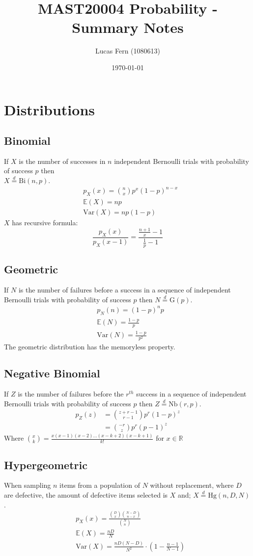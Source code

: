 \documentclass[titlepage,twocolumn]{article}
\title{MAST20004 Probability - Summary Notes}
\date{\today}
\author{Lucas Fern (1080613)}
\begin{document}
\section*{Distributions}
\subsection*{Binomial}
If $X$ is the number of successes in $n$ independent Bernoulli trials with probability of success $p$ then\\$X\stackrel{d}{=}\mbox{Bi}(n,p)$.
\begin{align*}
    &p_X(x)={\binom{n}{x}}p^x(1-p)^{n-x}\\
    &\mathbb{E}(X)=np\\
    &\mbox{Var}(X)=np(1-p)
\end{align*}
$X$ has recursive formula: $$\frac{p_X(x)}{p_X(x-1)}=\frac{\frac{n+1}{x}-1}{\frac{1}{p}-1}$$

\subsection*{Geometric}
If $N$ is the number of failures before a success in a sequence of independent Bernoulli trials with probability of success $p$ then $N\stackrel{d}{=}\mbox{G}(p)$.
\begin{align*}
    &p_N(n)=(1-p)^{n}p\\
    &\mathbb{E}(N)=\frac{1-p}{p}\\
    &\mbox{Var}(N)=\frac{1-p}{p^2}
\end{align*}
The geometric distribution has the memoryless property.

\subsection*{Negative Binomial}
If $Z$ is the number of failures before the $r^{th}$ success in a sequence of independent Bernoulli trials with probability of success $p$ then $Z\stackrel{d}{=}\mbox{Nb}(r,p)$.
\begin{align*}
    p_Z(z)&={\binom{z+r-1}{r-1}}p^r(1-p)^z\\
    &={\binom{-r}{z}}p^r(p-1)^z
\end{align*}
Where ${\binom{x}{k}} = \frac{x(x-1)(x-2)...(x-k+2)(x-k+1)}{k!}$ for $x \in \mathbb{R}$

\subsection*{Hypergeometric}
When sampling $n$ items from a population of $N$ without replacement, where $D$ are defective, the amount of defective items selected is $X$ and; $X\stackrel{d}{=}\mbox{Hg}(n,D,N)$.
\begin{align*}
    &p_X(x)=\frac{{\binom{D}{x}}{\binom{N-D}{n-x}}}{{\binom{N}{n}}}\\
    &\mathbb{E}(X)=\frac{nD}{N}\\
    &\mbox{Var}(X)=\frac{nD(N-D)}{N^2}\cdot(1-\frac{n-1}{N-1})
\end{align*}
\vfill
\end{document}
